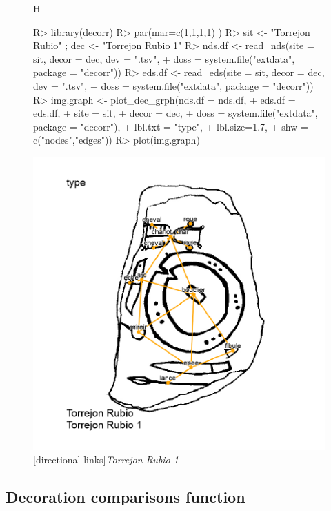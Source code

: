 \documentclass[article]{jss}
\begin{document}
\begin{figure}{H}
\centering
\begin{Schunk}
\begin{Sinput}
R> library(decorr)
R> par(mar=c(1,1,1,1) )
R> sit <- "Torrejon Rubio" ; dec <- "Torrejon Rubio 1"
R> nds.df <- read_nds(site = sit, decor = dec, dev = ".tsv",
+                     doss = system.file("extdata", package = "decorr"))
R> eds.df <- read_eds(site = sit, decor = dec, dev = ".tsv",
+                     doss = system.file("extdata", package = "decorr"))
R> img.graph <- plot_dec_grph(nds.df = nds.df,
+                             eds.df = eds.df,
+                             site = sit,
+                             decor = dec,
+                             doss = system.file("extdata", package = "decorr"),
+                             lbl.txt = "type",
+                             lbl.size=1.7,
+                             shw = c("nodes","edges"))
R> plot(img.graph)
\end{Sinput}
\end{Schunk}
\includegraphics{article_rvTH13-plotcm}
[directional links]{\emph{Torrejon Rubio 1}}
\end{figure}

\subsection{Decoration comparisons function} \label{sec:functions_one}
\end{document}
